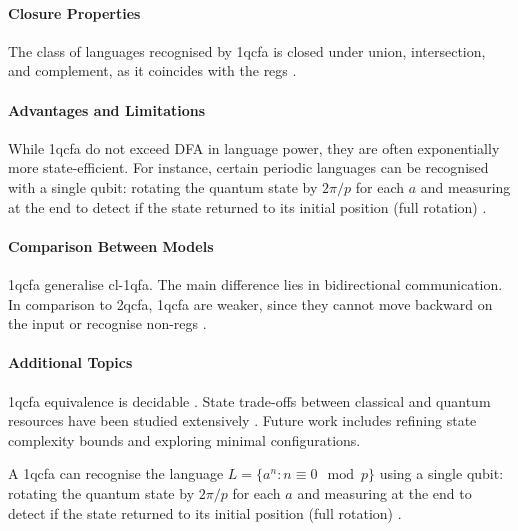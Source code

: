 \paragraph{Closure Properties}  
The class of languages recognised by \gls{1qcfa} is closed under union, intersection, and complement, as it coincides with the \glspl{reg} \cite{li2015hybrid}.

\paragraph{Advantages and Limitations}  
While \gls{1qcfa} do not exceed DFA in language power, they are often exponentially more state-efficient. For instance, certain periodic languages can be recognised with a single qubit: rotating the quantum state by $2\pi/p$ for each $a$ and measuring at the end to detect if the state returned to its initial position (full rotation) \cite{xiao2021state, bianchi2014size}.

\paragraph{Comparison Between Models}  
\gls{1qcfa} generalise \gls{cl-1qfa}. The main difference lies in bidirectional communication. In comparison to \gls{2qcfa}, \gls{1qcfa} are weaker, since they cannot move backward on the input or recognise non-\glspl{reg} \cite{li2015hybrid}.

\paragraph{Additional Topics}  
\gls{1qcfa} equivalence is decidable \cite{li2015hybrid}. State trade-offs between classical and quantum resources have been studied extensively \cite{qiu2009equivalence, xiao2021state}. Future work includes refining state complexity bounds and exploring minimal configurations.

\begin{example}  
A \gls{1qcfa} can recognise the language $L = \{ a^n : n \equiv 0 \mod p \}$ using a single qubit: rotating the quantum state by $2\pi/p$ for each $a$ and measuring at the end to detect if the state returned to its initial position (full rotation) \cite{bianchi2014power}.
\end{example}

\subsubsection{}

